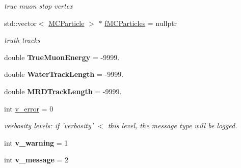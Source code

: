 \begin{DoxyCompactItemize}
\begin{DoxyCompactList}\small\item\em true muon stop vertex \item\end{DoxyCompactList}\item 
\hypertarget{classMCRecoEventLoader_a92922e07f398c491b9fd9e13ef012689}{
std::vector$<$ \hyperlink{classMCParticle}{MCParticle} $>$ $\ast$ \hyperlink{classMCRecoEventLoader_a92922e07f398c491b9fd9e13ef012689}{fMCParticles} = nullptr}
\label{classMCRecoEventLoader_a92922e07f398c491b9fd9e13ef012689}

\begin{DoxyCompactList}\small\item\em truth tracks \item\end{DoxyCompactList}\item 
\hypertarget{classMCRecoEventLoader_a6f1746151a4cc1c80204de806e6d3086}{
double {\bfseries TrueMuonEnergy} = -\/9999.}
\label{classMCRecoEventLoader_a6f1746151a4cc1c80204de806e6d3086}

\item 
\hypertarget{classMCRecoEventLoader_aca4904cc6f45b2dd128ac58faa6c060d}{
double {\bfseries WaterTrackLength} = -\/9999.}
\label{classMCRecoEventLoader_aca4904cc6f45b2dd128ac58faa6c060d}

\item 
\hypertarget{classMCRecoEventLoader_a9460d1064fa3c64c723dec37c834b75b}{
double {\bfseries MRDTrackLength} = -\/9999.}
\label{classMCRecoEventLoader_a9460d1064fa3c64c723dec37c834b75b}

\item 
\hypertarget{classMCRecoEventLoader_a402d61b93cd42d10500aedeb6e534b5d}{
int \hyperlink{classMCRecoEventLoader_a402d61b93cd42d10500aedeb6e534b5d}{v\_\-error} = 0}
\label{classMCRecoEventLoader_a402d61b93cd42d10500aedeb6e534b5d}

\begin{DoxyCompactList}\small\item\em verbosity levels: if 'verbosity' $<$ this level, the message type will be logged. \item\end{DoxyCompactList}\item 
\hypertarget{classMCRecoEventLoader_a4693e8478a38f832b1ea3daff98353a9}{
int {\bfseries v\_\-warning} = 1}
\label{classMCRecoEventLoader_a4693e8478a38f832b1ea3daff98353a9}

\item 
\hypertarget{classMCRecoEventLoader_a2e5d293cda46249cbab52275bd52c508}{
int {\bfseries v\_\-message} = 2}
\label{classMCRecoEventLoader_a2e5d293cda46249cbab52275bd52c508}


\end{DoxyCompactItemize}
